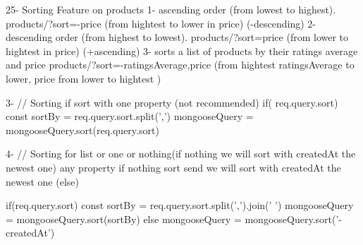 25- Sorting Feature on products
                1- ascending order (from lowest to highest).
                  products/?sort=-price  (from hightest to lower in price) (-descending)
                2- descending order (from highest to lowest).
                  products/?sort=price (from lower to hightest in price) (+ascending)
                3- sorts a list of products by their ratings average and price 
                   products/?sort=-ratingsAverage,price (from hightest ratingsAverage to lower, price from lower to hightest )

                3- // Sorting if sort with one property (not recommended)
                        if( req.query.sort){
                            const sortBy = req.query.sort.split(',')
                            mongooseQuery = mongooseQuery.sort(req.query.sort)
                        }

                4- // Sorting for list or one or nothing(if nothing we will sort with createdAt the newest one) any property
                     if nothing sort send we will sort with createdAt the newest one (else{})

                    if(req.query.sort){
                        const sortBy = req.query.sort.split(',').join(' ')
                        mongooseQuery = mongooseQuery.sort(sortBy)
                    }else{
                        mongooseQuery = mongooseQuery.sort('-createdAt')
                    }

